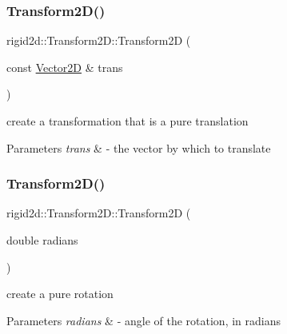 \subsubsection{\texorpdfstring{Transform2\+D()}{Transform2D()}\hspace{0.1cm}{\footnotesize\ttfamily [1/4]}}
{\footnotesize\ttfamily rigid2d\+::\+Transform2\+D\+::\+Transform2D (\begin{DoxyParamCaption}\item[{const \hyperlink{structrigid2d_1_1Vector2D}{Vector2D} \&}]{trans }\end{DoxyParamCaption})\hspace{0.3cm}{\ttfamily [explicit]}}



create a transformation that is a pure translation 


\begin{DoxyParams}{Parameters}
{\em trans} & -\/ the vector by which to translate \\
\hline
\end{DoxyParams}
\mbox{\label{classrigid2d_1_1Transform2D_a3f2f654cb039320e331931c0877b39a3}} 
\subsubsection{\texorpdfstring{Transform2\+D()}{Transform2D()}\hspace{0.1cm}{\footnotesize\ttfamily [2/4]}}
{\footnotesize\ttfamily rigid2d\+::\+Transform2\+D\+::\+Transform2D (\begin{DoxyParamCaption}\item[{double}]{radians }\end{DoxyParamCaption})\hspace{0.3cm}{\ttfamily [explicit]}}



create a pure rotation 


\begin{DoxyParams}{Parameters}
{\em radians} & -\/ angle of the rotation, in radians \\
\hline
\end{DoxyParams}
\mbox{\label{classrigid2d_1_1Transform2D_a47de6c24f25c57da553a0fdaf13e2138}} 

